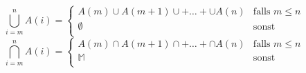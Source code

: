 $$\bigcup\limits_{i=m}^n A(i) = \left\lbrace \begin{array}{ll}
                                                 A(m) \cup A(m + 1) \cup + \dots + \cup A(n) & \textrm{falls } m \leq n \\
                                                 \emptyset                                   & \textrm{sonst}           \\
\end{array}  \right.$$
$$\bigcap\limits_{i=m}^n A(i) = \left\lbrace \begin{array}{ll}
                                                 A(m) \cap A(m + 1) \cap + \dots + \cap A(n) & \textrm{falls } m \leq n \\
                                                 \mathbb{M}                                  & \textrm{sonst}           \\
\end{array}  \right.$$